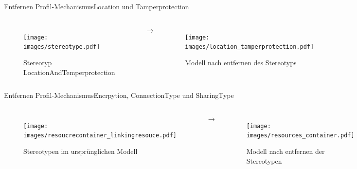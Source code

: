 \documentclass{sdqbeamer}
\begin{document}
\begin{frame}{Entfernen Profil-Mechanismus}{Location und Tamperprotection}
	\begin{columns}
		\centering
		\begin{figure}
		\texttt{[image: images/stereotype.pdf]}
		\caption{Stereotyp LocationAndTemperprotection}
	\end{figure}
	\centering
	$\rightarrow$
	\centering
	\begin{figure}
	\texttt{[image: images/location\_tamperprotection.pdf]}
	\caption{Modell nach entfernen des Stereotyps}
	\end{figure}
	\end{columns}
\end{frame}
\begin{frame}{Entfernen Profil-Mechanismus}{Encrpytion, ConnectionType und SharingType}
	\begin{columns}
		\centering
		\begin{figure}
			\texttt{[image: images/resoucrecontainer\_linkingresouce.pdf]}
			\caption{Stereotypen im ursprünglichen Modell}
		\end{figure}
		\centering
		$\rightarrow$
		\centering
		\begin{figure}
			\texttt{[image: images/resources\_container.pdf]}
			\caption{Modell nach entfernen der Stereotypen}
		\end{figure}
	\end{columns}
\end{frame}
\end{document}
